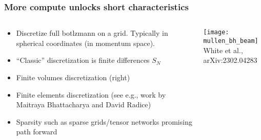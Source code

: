 \documentclass[]{beamer}
\begin{document}
\begin{frame}
  \frametitle{More compute unlocks short characteristics}
  \begin{columns}
    \begin{column}{6cm}
      \begin{itemize}
      \item Discretize full botlzmann on a grid. Typically in
        spherical coordinates (in momentum space).
      \item ``Classic'' discretization is finite differences $S_N$
      \item Finite volumes discretization (right)
      \item Finite elements discretization (see e.g., work by Maitraya
        Bhattacharya and David Radice)
      \item Sparsity such as sparse grids/tensor networks promising path forward
      \end{itemize}
    \end{column}
    \begin{column}{6cm}
      \begin{center}
        \texttt{[image: mullen\_bh\_beam]}\\
        {\footnotesize White et al., arXiv:2302.04283}
      \end{center}
    \end{column}
  \end{columns}
\end{frame}
\end{document}
